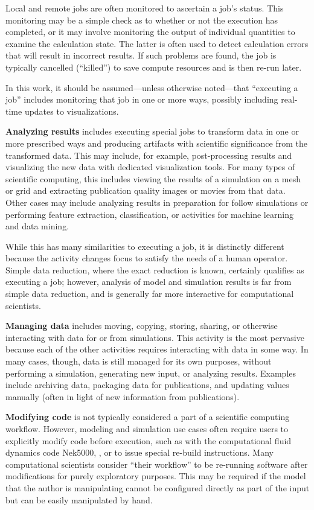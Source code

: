 Local and remote jobs are often monitored to ascertain a job's status.
This monitoring may be a simple check as to whether or not the execution
has completed, or it may involve monitoring the output of individual
quantities to examine the calculation state. The latter is often used to
detect calculation errors that will result in incorrect results. If such
problems are found, the job is typically cancelled (``killed'') to save
compute resources and is then re-run later.

In this work, it should be assumed---unless otherwise noted---that
``executing a job'' includes monitoring that job in one or more ways,
possibly including real-time updates to visualizations.

\textbf{Analyzing results} includes executing special jobs to transform
data in one or more prescribed ways and producing artifacts with
scientific significance from the transformed data. This may include, for
example, post-processing results and visualizing the new data with
dedicated visualization tools. For many types of scientific computing,
this includes viewing the results of a simulation on a mesh or grid and
extracting publication quality images or movies from that data. Other
cases may include analyzing results in preparation for follow
simulations or performing feature extraction, classification, or
activities for machine learning and data mining.

While this has many similarities to executing a job, it is distinctly
different because the activity changes focus to satisfy the needs of a
human operator. Simple data reduction, where the exact reduction is
known, certainly qualifies as executing a job; however, analysis of
model and simulation results is far from simple data reduction, and is
generally far more interactive for computational scientists.

\textbf{Managing data} includes moving, copying, storing, sharing, or
otherwise interacting with data for or from simulations. This activity
is the most pervasive because each of the other activities requires
interacting with data in some way. In many cases, though, data is still
managed for its own purposes, without performing a simulation,
generating new input, or analyzing results. Examples include archiving
data, packaging data for publications, and updating values manually
(often in light of new information from publications).

\textbf{Modifying code} is not typically considered a part of a
scientific computing workflow. However, modeling and simulation use
cases often require users to explicitly modify code before execution,
such as with the computational fluid dynamics code Nek5000,
\cite{the_nek5000_team_nek5000_2014}, or to issue special re-build instructions.
Many computational scientists consider ``their workflow'' to be re-running
software after modifications for purely exploratory purposes. This may
be required if the model that the author is manipulating cannot be
configured directly as part of the input but can be easily manipulated
by hand.

